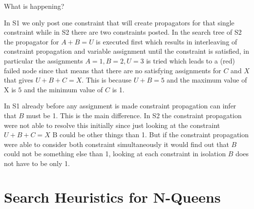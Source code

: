 \documentclass[a4paper, 11pt]{article}
\begin{document}
What is happening?

In S1 we only post one constraint that will create propagators for that single constraint while in S2 there are two constraints posted. In the search tree of S2 the propagator for $A + B = U$ is executed first which results in interleaving of constraint propagation and variable assignment until the constraint is satisfied, in particular the assignments $A = 1, B = 2, U = 3$ is tried which leads to a (red) failed node since that means that there are no satisfying assignments for $C$ and $X$ that gives $U+B+C = X$. This is because $U+B=5$ and the maximum value of X is $5$ and the minimum value of $C$ is 1.

In S1 already before any assignment is made constraint propagation can infer that $B$ must be 1. This is the main difference. In S2 the constraint propagation were not able to resolve this initially since just looking at the constraint $U+B+C=X$ B could be other things than 1. But if the constraint propagation were able to consider both constraint simultaneously it would find out that $B$ could not be something else than 1, looking at each constraint in isolation $B$ does not have to be only 1.

\section*{Search Heuristics for N-Queens}
\end{document}
